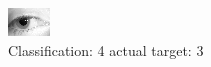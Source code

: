 \begin{figure}[h!]
\begin{center}
\includegraphics[width=0.60\columnwidth]{figures/ID1365_class_4_target_3.png}
\end{center}
\caption{ Classification: 4 actual target: 3}
\label{fig:ID1365_class_4_target_3}
\end{figure}
